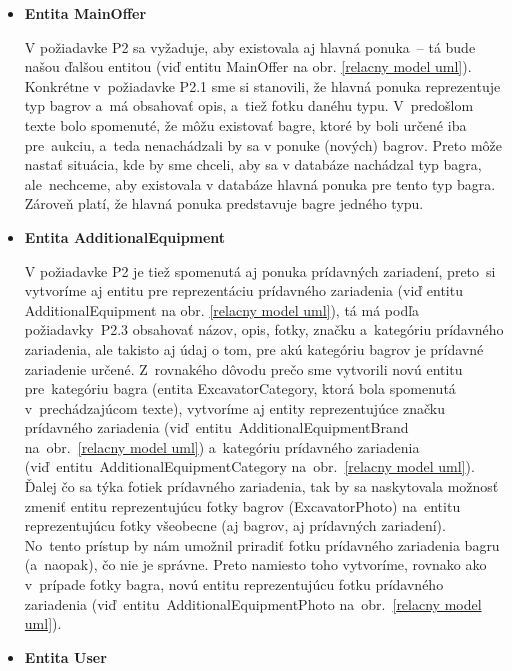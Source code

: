 \begin{itemize}
\item \textbf{Entita MainOffer}

V požiadavke P2 sa vyžaduje, aby existovala aj hlavná ponuka~-- tá bude našou ďalšou entitou (viď entitu MainOffer na obr. \ref{relacny model uml}). Konkrétne v~požiadavke P2.1 sme si stanovili, že hlavná ponuka reprezentuje typ bagrov a~má obsahovať opis, a~tiež fotku danéhu typu. V~predošlom texte bolo spomenuté, že môžu existovať bagre, ktoré by boli určené iba pre~aukciu, a~teda nenachádzali by sa v ponuke (nových) bagrov. Preto môže nastať situácia, kde by sme chceli, aby sa v databáze nachádzal typ bagra, ale~nechceme, aby existovala v databáze hlavná ponuka pre tento typ bagra. Zároveň platí, že hlavná ponuka predstavuje bagre jedného typu.

\item \textbf{Entita AdditionalEquipment}

V požiadavke P2 je tiež spomenutá aj ponuka prídavných zariadení, preto~si vytvoríme aj entitu pre reprezentáciu prídavného zariadenia (viď entitu AdditionalEquipment na obr. \ref{relacny model uml}), tá má podľa požiadavky~P2.3 obsahovať názov, opis, fotky, značku a~kategóriu prídavného zariadenia, ale takisto aj údaj o tom, pre akú kategóriu bagrov je prídavné zariadenie určené. Z~rovnakého dôvodu prečo sme vytvorili novú entitu pre~kategóriu bagra (entita ExcavatorCategory, ktorá bola spomenutá v~prechádzajúcom texte), vytvoríme aj entity reprezentujúce značku prídavného zariadenia (viď~entitu~AdditionalEquipmentBrand na~obr.~\ref{relacny model uml}) a~kategóriu prídavného zariadenia (viď~entitu~AdditionalEquipmentCategory na~obr.~\ref{relacny model uml}). Ďalej čo sa týka fotiek prídavného zariadenia, tak by sa naskytovala možnosť zmeniť entitu reprezentujúcu fotky bagrov (ExcavatorPhoto) na~entitu reprezentujúcu fotky všeobecne (aj bagrov, aj prídavných zariadení). No~tento prístup by nám umožnil priradiť fotku prídavného zariadenia bagru (a~naopak), čo nie je správne. Preto namiesto toho vytvoríme, rovnako ako v~prípade fotky bagra, novú entitu reprezentujúcu fotku prídavného zariadenia (viď~entitu~AdditionalEquipmentPhoto na~obr.~\ref{relacny model uml}).

\item \textbf{Entita User}


\end{itemize}
